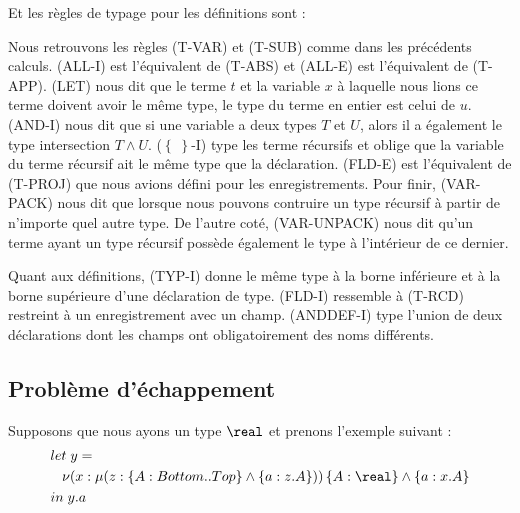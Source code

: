 Et les règles de typage pour les définitions sont :


Nous retrouvons les règles (T-VAR) et (T-SUB) comme dans les précédents calculs.
(ALL-I) est l'équivalent de (T-ABS) et (ALL-E) est l'équivalent de (T-APP).
(LET) nous dit que le terme $t$ et la variable $x$ à laquelle nous lions ce
terme doivent avoir le même type, le type du terme en entier est celui de $u$.
(AND-I) nous dit que si une variable a deux types $T$ et $U$, alors il a
également le type intersection $T \wedge U$. ($\left\{ \; \right\}$-I) type les terme
récursifs et oblige que la variable du terme récursif ait le même type que la déclaration.
(FLD-E) est l'équivalent de (T-PROJ) que nous avions défini pour les
enregistrements.
Pour finir, (VAR-PACK) nous dit que lorsque nous pouvons
contruire un type récursif à partir de n'importe quel autre type. De l'autre
coté, (VAR-UNPACK) nous dit qu'un terme ayant un type récursif possède également
le type à l'intérieur de ce dernier.

Quant aux définitions, (TYP-I) donne le même type à la borne inférieure et à la
borne supérieure d'une déclaration de type. (FLD-I) ressemble à (T-RCD)
restreint à un enregistrement avec un champ. (ANDDEF-I) type l'union de deux
déclarations dont les champs ont obligatoirement des noms différents.

\subsection*{Problème d'échappement}

Supposons que nous ayons un type $\real$ et prenons l'exemple suivant :
\begin{align*}
  & let \; y = \\
  &\; \; \; \nu(x : \mu(z : \left\{ A : Bottom .. Top \right\} \wedge \left\{ a : z.A \right\})) \left\{ A : \real \right\} \wedge \left\{ a : x.A \right\} \\
  & in \; y.a
\end{align*}

